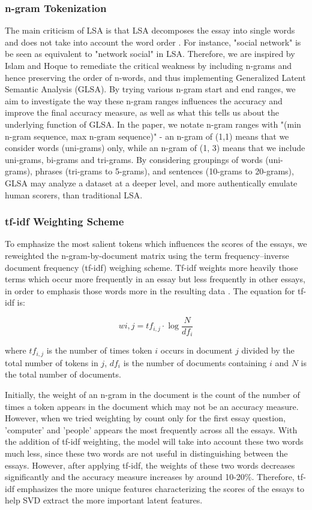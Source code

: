 \documentclass[10pt,letterpaper]{article}
\begin{document}
\subsubsection{n-gram Tokenization}
The main criticism of LSA is that LSA decomposes the essay into single words and does not take into account the word order \cite{kintsch2002potential}. For instance, "social network" is be seen as equivalent to "network social" in LSA. Therefore, we are inspired by Islam and Hoque to remediate the critical weakness by including n-grams and hence preserving the order of n-words, and thus implementing Generalized Latent Semantic Analysis (GLSA). By trying various n-gram start and end ranges, we aim to investigate the way these n-gram ranges influences the accuracy and improve the final accuracy measure, as well as what this tells us about the underlying function of GLSA. In the paper, we notate n-gram ranges with "(min n-gram sequence, max n-gram sequence)" - an n-gram of (1,1) means that we consider words (uni-grams) only, while an n-gram of (1, 3) means that we include uni-grams, bi-grams and tri-grams. By considering groupings of words (uni-grams), phrases (tri-grams to 5-grams), and sentences (10-grams to 20-grams), GLSA may analyze a dataset at a deeper level, and more authentically emulate human scorers, than traditional LSA. 

\subsubsection{tf-idf Weighting Scheme}

To emphasize the most salient tokens which influences the scores of the essays, we reweighted the n-gram-by-document matrix using the term frequency–inverse document frequency (tf-idf) weighing scheme. Tf-idf weights more heavily those terms which occur more frequently in an essay but less frequently in other essays, in order to emphasis those words more in the resulting data \cite{islam2010automated}. The equation for tf-idf is:

$$w{i,j} = tf_{i,j} \cdot \log \frac{N}{df_i}$$

where $tf_{i,j}$ is the number of times token $i$ occurs in document $j$ divided by the total number of tokens in $j$, $df_i$ is the number of documents containing $i$ and $N$ is the total number of documents.

Initially, the weight of an n-gram in the document is the count of the number of times a token appears in the document which may not be an accuracy measure. However, when we tried weighting by count only for the first essay question, 'computer' and 'people' appears the most frequently across all the essays. With the addition of tf-idf weighting, the model will take into account these two words much less, since these two words are not useful in distinguishing between the essays. However, after applying tf-idf, the weights of these two words decreases significantly and the accuracy measure increases by around 10-20\%. Therefore, tf-idf emphasizes the more unique features characterizing the scores of the essays to help SVD extract the more important latent features.
\end{document}
